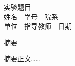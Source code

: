 \documentclass[12pt,a4paper]{ctexart}
\begin{document}
\begin{center}
{\heiti{} 实验题目}\\[1em]
{\songti{} 姓名\ \ 学号\ \ 院系}\\[0.3em]
{\songti{} 单位\ \ 指导教师\ \ 日期}
\end{center}

\begin{center}{\heiti{} 摘\quad 要}\end{center}
{ 摘要正文……}

\end{document}
